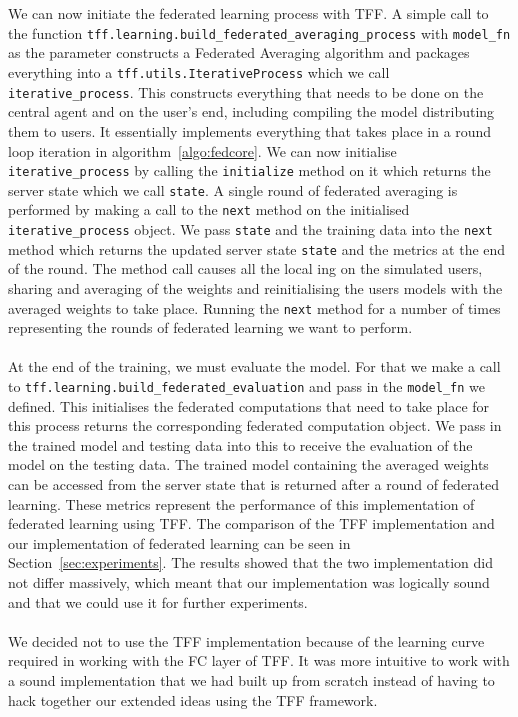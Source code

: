 \documentclass[12pt]{article}
\begin{document}
\\\\
We can now initiate the federated learning process with TFF. A simple call to the function \texttt{tff.learning.build\_federated\_averaging\_process} with \texttt{model\_fn} as the parameter constructs a Federated Averaging algorithm and packages everything into a \texttt{tff.utils.IterativeProcess} which we call \texttt{iterative\_process}. This constructs everything that needs to be done on the central agent and on the user's end, including compiling the model distributing them to users. It essentially implements everything that takes place in a round loop iteration in algorithm~\ref{algo:fedcore}. We can now initialise \texttt{iterative\_process} by calling the \texttt{initialize} method on it which returns the server state which we call \texttt{state}. A single round of federated averaging is performed by making a call to the \texttt{next} method on the initialised \texttt{iterative\_process} object. We pass \texttt{state} and the training data into the \texttt{next} method which returns the updated server state \texttt{state} and the metrics at the end of the round. The method call causes all the local 
ing on the simulated users, sharing and averaging of the weights and reinitialising the users models with the averaged weights to take place. Running the \texttt{next} method for a number of times representing the rounds of federated learning we want to perform. 
\\\\
At the end of the training, we must evaluate the model. For that we make a call to \texttt{tff.learning.build\_federated\_evaluation} and pass in the \texttt{model\_fn} we defined. This initialises the federated computations that need to take place for this process returns the corresponding federated computation object. We pass in the trained model and testing data into this to receive the evaluation of the model on the testing data. The trained model containing the averaged weights can be accessed from the server state that is returned after a round of federated learning. These metrics represent the performance of this implementation of federated learning using TFF. The comparison of the TFF implementation and our implementation of federated learning can be seen in Section~\ref{sec:experiments}. The results showed that the two implementation did not differ massively, which meant that our implementation was logically sound and that we could use it for further experiments.
\\\\
We decided not to use the TFF implementation because of the learning curve required in working with the FC layer of TFF. It was more intuitive to work with a sound implementation that we had built up from scratch instead of having to hack together our extended ideas using the TFF framework. 
\clearpage
\end{document}
